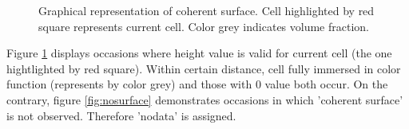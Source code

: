\documentclass[a4paper]{article}
\begin{document}
\begin{figure}[h]
  \begin{subfigure}[b]{\textwidth}
     \centering
     \subcaption{}
  \end{subfigure}

  \begin{subfigure}[b]{\textwidth}
     \centering
     \subcaption{}
  \end{subfigure}

  \begin{subfigure}[b]{\textwidth}
     \centering
     \subcaption{}
  \end{subfigure}
  \caption{Graphical representation of coherent surface. Cell highlighted by red square represents current cell. Color grey indicates volume fraction.}
  \label{fig:surface}
\end{figure}
Figure \ref{fig:surface} displays occasions where height value is valid for current cell (the one hightlighted by red square). Within certain distance, cell fully immersed in color function (represents by color grey) and those with $0$ value both occur. On the contrary, figure \ref{fig:nosurface} demonstrates occasions in which 'coherent surface' is not observed. Therefore 'nodata' is assigned.
\end{document}
